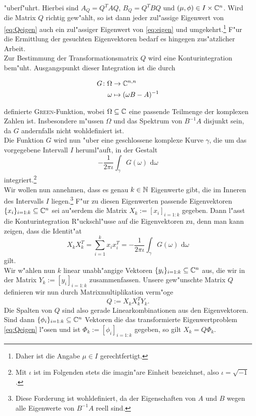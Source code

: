 "uberf"uhrt. Hierbei sind $A_Q = Q^TAQ$, $B_Q = Q^TBQ$ und $(\mu, \phi)
\in I\times\mathbb{C}^n$.
Wird die Matrix $Q$ richtig gew"ahlt, so ist dann jeder zul"assige Eigenwert von
\eqref{eq:Qeigen} auch ein zul"assiger Eigenwert von \eqref{eq:eigen} und
umgekehrt.\footnote{Daher ist die Angabe $\mu\in I$ gerechtfertigt.}
F"ur die Ermittlung der gesuchten Eigenvektoren bedarf es hingegen zus"atzlicher Arbeit.\\

Zur Bestimmung der Transformationsmatrix $Q$ wird eine Konturintegration bem"uht.
Ausgangspunkt dieser Integration ist die durch

  \begin{align*}
  G\colon\Omega &\to\mathbb{C}^{n,n}\\
  \omega &\mapsto (\omega B - A)^{-1}
  \end{align*}

definierte  \textsc{Green}-Funktion, wobei $\Omega \subseteq \mathbb{C}$ eine passende
Teilmenge der komplexen Zahlen ist. Insbesondere m"ussen $\Omega$ und das
Spektrum von $B^{-1}A$ disjunkt sein, da $G$ andernfalls nicht wohldefiniert ist.\\

Die Funktion $G$ wird nun "uber eine geschlossene komplexe Kurve $\gamma$,
die um das vorgegebene Intervall $I$ heruml"auft, in der Gestalt
\[
-\frac{1}{2\pi\iota}\int_\gamma G(\omega)\text{ d}\omega
\]
integriert.\footnote{Mit $\iota$ ist im Folgenden stets die imagin"are Einheit bezeichnet,
also $\iota = \sqrt{-1}$.}\\

Wir wollen nun annehmen,
dass es genau $k\in\mathbb{N}$ Eigenwerte gibt,
die im Inneren des Intervalls $I$ liegen.\footnote{Diese Forderung ist wohldefiniert, da
der Eigenschaften von $A$ und $B$ wegen alle Eigenwerte von $B^{-1}A$ reell sind.}
F"ur zu diesen Eigenwerten passende Eigenvektoren $\{x_i\}_{i=1:k} \subseteq \mathbb{C}^n$ sei au"serdem die Matrix
$X_k := [x_i]_{i=1:k}$ gegeben.
Dann l"asst die Konturintegration R"uckschl"usse auf die Eigenvektoren zu, denn man kann
zeigen, dass die Identit"at
\begin{equation}\label{eq:integral}
X_k X_k^T = \sum_{i=1}^k x_i x_i^T =
-\frac{1}{2\pi\iota}\int_\gamma G(\omega)\text{ d}\omega
\end{equation}
gilt.\\

Wir w"ahlen nun $k$ linear unabh"angige Vektoren $\{y_i\}_{i=1:k} \subseteq \mathbb{C}^n$
aus, die wir in der Matrix $Y_k := [ y_i ]_{i=1:k}$ zusammenfassen.
Unsere gew"unschte Matrix $Q$ definieren wir nun durch Matrixmultiplikation
verm"oge
\begin{equation}\label{eq:Q}
Q := X_k X_k^T Y_k.
\end{equation}
Die Spalten von $Q$ sind also gerade Linearkombinationen aus den Eigenvektoren.
Sind dann $\{\phi_i\}_{i=1:k} \subseteq \mathbb{C}^n$ Vektoren die das transformierte
Eigenwertproblem \eqref{eq:Qeigen} l"osen
und ist $\Phi_k:=[\phi_i]_{i=1:k}$ gegeben,
so gilt $X_k = Q \Phi_k$.\\

